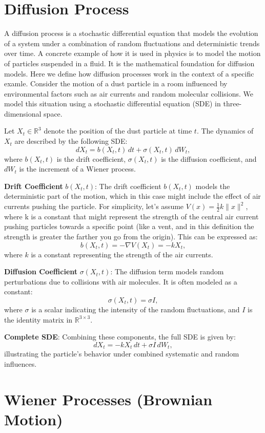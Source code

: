 \documentclass[12pt]{article}
\begin{document}
\section{Diffusion Process}
A diffusion process is a stochastic differential equation that models the evolution of a system under a combination of random fluctuations and deterministic trends over time. A concrete example of how it is used in physics is to model the motion of particles suspended in a fluid. It is the mathematical foundation for diffusion models. Here we define how diffusion processes work in the context of a specific examle. Consider the motion of a dust particle in a room influenced by environmental factors such as air currents and random molecular collisions. We model this situation using a stochastic differential equation (SDE) in three-dimensional space.

Let \(X_t \in \mathbb{R}^3\) denote the position of the dust particle at time \(t\). The dynamics of \(X_t\) are described by the following SDE:
\[
dX_t = b(X_t, t) \, dt + \sigma(X_t, t) \, dW_t,
\]
where \(b(X_t, t)\) is the drift coefficient, \(\sigma(X_t, t)\) is the diffusion coefficient, and \(dW_t\) is the increment of a Wiener process.

\textbf{Drift Coefficient} \(b(X_t, t)\):
The drift coefficient \(b(X_t, t)\) models the deterministic part of the motion, which in this case might include the effect of air currents pushing the particle. For simplicity, let's assume \(V(x) = \frac{1}{2}k \|x\|^2\), where k is a constant that might represent the strength of the central air current pushing particles towards a specific point (like a vent, and in this definition the strength is greater the farther you go from the origin). This can be expressed as:
\[
b(X_t, t) = -\nabla V(X_t) = -k X_t,
\]
where \(k\) is a constant representing the strength of the air currents.

\textbf{Diffusion Coefficient} \(\sigma(X_t, t)\):
The diffusion term models random perturbations due to collisions with air molecules. It is often modeled as a constant:
\[
\sigma(X_t, t) = \sigma I,
\]
where \(\sigma\) is a scalar indicating the intensity of the random fluctuations, and \(I\) is the identity matrix in \(\mathbb{R}^{3 \times 3}\).

\textbf{Complete SDE}:
Combining these components, the full SDE is given by:
\[
dX_t = -k X_t \, dt + \sigma I \, dW_t,
\]
illustrating the particle's behavior under combined systematic and random influences.
\section{Wiener Processes (Brownian Motion)}
\end{document}
